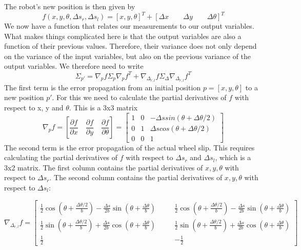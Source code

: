 The robot's new position is then given by
\begin{equation}
f(x,y,\theta,\Delta s_r, \Delta s_l)=[x,y,\theta]^T + [\Delta x \qquad \Delta y \qquad \Delta \theta]^T
\end{equation}
We now have a function that relates our measurements to our output variables. What makes things complicated here is that the output variables are also a function of their previous values. Therefore, their variance does not only depend on the variance of the input variables, but also on the previous variance of the output variables. We therefore need to write
\begin{equation}\label{eq:errorpropodom}
\Sigma_{p'}=\nabla_p f \Sigma_p \nabla_p f^T + \nabla_{\Delta_{r,l}}f \Sigma_{\Delta}\nabla_{\Delta_{r,l}}f^T
\end{equation}
The first term is the error propagation from an initial position $ p=[x,y,\theta]$ to a new position $ p'$. For this we need to calculate the partial derivatives of $ f$ with respect to x, y and $ \theta$. This is a 3x3 matrix
\begin{equation}
\nabla_p f=\left[\frac{\partial f}{\partial x} \quad \frac{\partial f}{\partial y} \quad \frac{\partial f}{\partial \theta}\right]=\left[\begin{array}{ccc}1 & 0 & -\Delta s sin(\theta +\Delta \theta /2)\\0 & 1 & \Delta s cos(\theta + \Delta \theta/2)\\0 & 0 &1\end{array}\right]
\end{equation}
The second term is the error propagation of the actual wheel slip. This requires calculating the partial derivatives of $ f$ with respect to $ \Delta s_r$ and $ \Delta s_l$, which is a 3x2 matrix. The first column contains the partial derivatives of $ x,y,\theta$ with respect to $ \Delta s_r$. The second column contains the partial derivatives of $ x,y,\theta$ with respect to $ \Delta s_l$:
\begin{scriptsize}
\begin{equation}
\nabla_{\Delta_{r,l}} f=\left[
\begin{array}{ccc}
\frac{1}{2}\cos(\theta+\frac{\Delta \theta/2}{b})
-\frac{\Delta s}{2b}\sin(\theta+\frac{\Delta \theta}{b})
& \quad & \frac{1}{2}\cos(\theta+\frac{\Delta \theta/2}{b})
-\frac{\Delta s}{2b}\sin(\theta+\frac{\Delta \theta}{b})
\\
\frac{1}{2}\sin(\theta+\frac{\Delta \theta/2}{b})
+\frac{\Delta s}{2b}\cos(\theta+\frac{\Delta \theta}{b})
& \quad & \frac{1}{2}\sin(\theta+\frac{\Delta \theta/2}{b})
+\frac{\Delta s}{2b}\cos(\theta+\frac{\Delta \theta}{b})
\\
\frac{1}{2} & \quad & -\frac{1}{2}
\end{array}
\right]
\end{equation}
\end{scriptsize}

